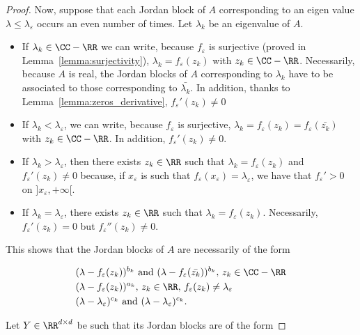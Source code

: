 \documentclass{article}
\begin{document}
\begin{proof}
Now, suppose that each Jordan block of $A$ corresponding to an eigen value 
$
\lambda \leq \lambda_{\varepsilon} 
$
occurs an even number of times.
Let $\lambda_k$ be an eigenvalue of $A$.
\begin{itemize}
    \item If $\lambda_k \in \CC-\RR$  we can write, because $f_{\varepsilon}$ is surjective (proved in Lemma~\ref{lemma:surjectivity}), $\lambda_k = f_{\varepsilon}(z_k)$ with $z_k \in \CC-\RR$. Necessarily, because $A$ is real, the Jordan blocks of $A$ corresponding to $\lambda_k$ have to be associated to those corresponding to $\bar{\lambda_k}$. In addition, thanks to Lemma~\ref{lemma:zeros_derivative}, $f_{\varepsilon}'(z_k) \neq 0$ 
    \item If $\lambda_k < \lambda_{\varepsilon}$, we can write, because $f_{\varepsilon}$ is surjective, $\lambda_k = f_{\varepsilon}(z_k) = f_{\varepsilon}(\bar{z_k})$ with $z_k \in \CC-\RR$. In addition, $f_{\varepsilon}'(z_k) \neq 0$.
    \item If $\lambda_k > \lambda_{\varepsilon}$, then there exists $z_k \in \RR$ such that $\lambda_k = f_{\varepsilon}(z_k)$ and $f_{\varepsilon}'(z_k) \neq 0 $ because, if $x_{\varepsilon}$ is such that $f_{\varepsilon}(x_{\varepsilon}) = \lambda_{\varepsilon}$, we have that $f_{\varepsilon}'>0$ on $]x_{\varepsilon}, +\infty[$.
     \item If $\lambda_k = \lambda_{\varepsilon}$, there exists $z_k \in \RR$ such that $\lambda_k = f_{\varepsilon}(z_k)$. Necessarily, $f_{\varepsilon}'(z_k) = 0$ but $f_{\varepsilon}''(z_k) \neq 0$.
\end{itemize}

This shows that the Jordan blocks of $A$ are necessarily of the form 

\begin{equation*}
    \begin{split}
    &(\lambda - f_{\varepsilon}(z_k))^{b_k} \text{ and } (\lambda - f_{\varepsilon}(\bar{z_k}))^{b_k}  ,\, z_k \in \CC -\RR\\
        &(\lambda - f_{\varepsilon}(z_k))^{a_k}   ,\, z_k \in \RR ,\, f_{\varepsilon}(z_k)\neq\lambda_{\varepsilon} \\
         &(\lambda - \lambda_{\varepsilon})^{c_k} \text{ and } (\lambda - \lambda_{\varepsilon})^{c_k}.
    \end{split}
\end{equation*}

Let $Y\in \RR^{d\times d}$ be such that its Jordan blocks are of the form 


\end{proof}
\end{document}
